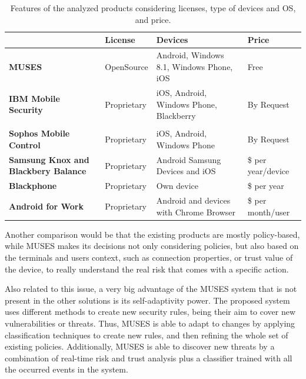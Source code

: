 \begin{table}[ht]
\begin{footnotesize}
  \centering
  \renewcommand{\arraystretch}{1.8}%
  \begin{tabular}{>{\centering\bfseries}m{1in} >{\centering}m{1in} >{\centering}m{1in} >{\centering\arraybackslash}m{1in}}
       \toprule
      & \textbf{License} & \textbf{Devices} & \textbf{Price} \\
       \midrule
    MUSES & OpenSource & Android, Windows 8.1, Windows Phone, iOS & Free  \\
       \arrayrulecolor[gray]{0.8}\hline
    IBM Mobile Security & Proprietary & iOS, Android, Windows Phone, Blackberry  &  By Request\\\\
        \arrayrulecolor[gray]{0.8}\hline
    Sophos Mobile Control & Proprietary & iOS, Android, Windows Phone  &  By Request\\
        \arrayrulecolor[gray]{0.8}\hline
    Samsung Knox and Blackbery Balance & Proprietary & Android Samsung Devices and iOS & 12\$ per year/device \\
        \arrayrulecolor[gray]{0.8}\hline
    Blackphone & Proprietary & Own device & 120\$ per year \\
        \arrayrulecolor[gray]{0.8}\hline
    Android for Work & Proprietary & Android and devices with Chrome Browser &  12\$ per month/user\\
       \bottomrule
  \end{tabular}
\end{footnotesize}
  \caption{Features of the analyzed products considering licenses, type of devices and OS, and price.}
  \label{tab:features}
\end{table}


Another comparison would be that the existing products are mostly policy-based, while MUSES makes its decisions not only considering policies, but also based on the terminals and users context, such as connection properties, or trust value of the device, to really understand the real risk that comes with a specific action.

Also related to this issue, a very big advantage of the MUSES system that is not present in the other solutions is its self-adaptivity power. The proposed system uses different methods to create new security rules, being their aim to cover new vulnerabilities or threats. Thus, MUSES is able to adapt to changes by applying classification techniques to create new rules, and then refining the whole set of existing policies. Additionally, MUSES is able to discover new threats by a combination of real-time risk and trust analysis plus a classifier trained with all the occurred events in the system.

